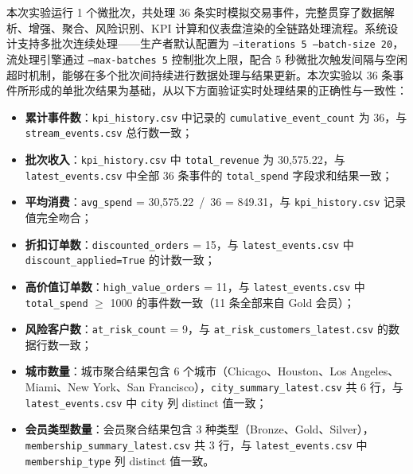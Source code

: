 \documentclass[12pt,hyperref,a4paper,UTF8]{ctexart}
\begin{document}
本次实验运行 1 个微批次，共处理 36 条实时模拟交易事件，完整贯穿了数据解析、增强、聚合、风险识别、KPI 计算和仪表盘渲染的全链路处理流程。系统设计支持多批次连续处理——生产者默认配置为 \texttt{--iterations 5 --batch-size 20}，流处理引擎通过 \texttt{--max-batches 5} 控制批次上限，配合 5 秒微批次触发间隔与空闲超时机制，能够在多个批次间持续进行数据处理与结果更新。本次实验以 36 条事件所形成的单批次结果为基础，从以下方面验证实时处理结果的正确性与一致性：

\begin{itemize}
    \item \textbf{累计事件数}：\texttt{kpi\_history.csv} 中记录的 \texttt{cumulative\_event\_count} 为 36，与 \texttt{stream\_events.csv} 总行数一致；
    \item \textbf{批次收入}：\texttt{kpi\_history.csv} 中 \texttt{total\_revenue} 为 30,575.22，与 \texttt{latest\_events.csv} 中全部 36 条事件的 \texttt{total\_spend} 字段求和结果一致；
    \item \textbf{平均消费}：\texttt{avg\_spend} = 30,575.22 \,/\, 36 = 849.31，与 \texttt{kpi\_history.csv} 记录值完全吻合；
    \item \textbf{折扣订单数}：\texttt{discounted\_orders} = 15，与 \texttt{latest\_events.csv} 中 \texttt{discount\_applied=True} 的计数一致；
    \item \textbf{高价值订单数}：\texttt{high\_value\_orders} = 11，与 \texttt{latest\_events.csv} 中 \texttt{total\_spend} $\geq$ 1000 的事件数一致（11 条全部来自 Gold 会员）；
    \item \textbf{风险客户数}：\texttt{at\_risk\_count} = 9，与 \texttt{at\_risk\_customers\_latest.csv} 的数据行数一致；
    \item \textbf{城市数量}：城市聚合结果包含 6 个城市（Chicago、Houston、Los Angeles、Miami、New York、San Francisco），\texttt{city\_summary\_latest.csv} 共 6 行，与 \texttt{latest\_events.csv} 中 \texttt{city} 列 distinct 值一致；
    \item \textbf{会员类型数量}：会员聚合结果包含 3 种类型（Bronze、Gold、Silver），\texttt{membership\_summary\_latest.csv} 共 3 行，与 \texttt{latest\_events.csv} 中 \texttt{membership\_type} 列 distinct 值一致。
\end{itemize}
\end{document}
